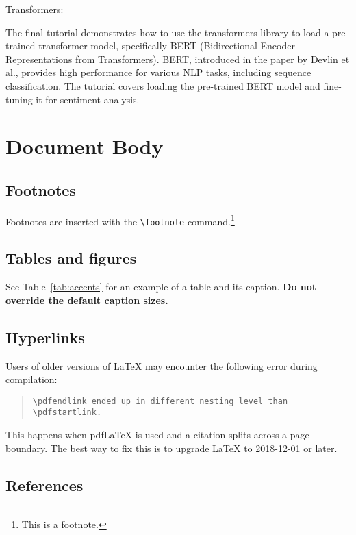 \documentclass[11pt]{article}
\begin{document}
Transformers:

The final tutorial demonstrates how to use the transformers library to load a pre-trained transformer model, specifically BERT (Bidirectional Encoder Representations from Transformers). BERT, introduced in the paper by Devlin et al., provides high performance for various NLP tasks, including sequence classification. The tutorial covers loading the pre-trained BERT model and fine-tuning it for sentiment analysis.


\section{Document Body}

\subsection{Footnotes}

Footnotes are inserted with the \verb|\footnote| command.\footnote{This is a footnote.}

\subsection{Tables and figures}

See Table~\ref{tab:accents} for an example of a table and its caption.
\textbf{Do not override the default caption sizes.}

\subsection{Hyperlinks}

Users of older versions of \LaTeX{} may encounter the following error during compilation: 
\begin{quote}
\tt\verb|\pdfendlink| ended up in different nesting level than \verb|\pdfstartlink|.
\end{quote}
This happens when pdf\LaTeX{} is used and a citation splits across a page boundary. The best way to fix this is to upgrade \LaTeX{} to 2018-12-01 or later.

\subsection{References}
\end{document}
